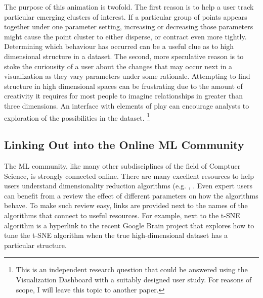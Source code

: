 \documentclass{sigchi}
\begin{document}
The purpose of this animation is twofold. %
%
The first reason is to help a user track particular emerging clusters of interest. %
%
If a particular group of points appears together under one parameter setting, increasing or decreasing those parameters might cause the point cluster to either disperse, or contract even more tightly. %
%
Determining which behaviour has occurred can be a useful clue as to high dimensional structure in a dataset. %
%
The second, more speculative reason is to stoke the curiousity of a user about the changes that may occur next in a visualization as they vary parameters under some rationale. %
%
Attempting to find structure in high dimensional spaces can be frustrating due to the amount of creativity it requires for most people to imagine relationships in greater than three dimensions.
%
An interface with elements of play can encourage analysts to exploration of the possibilities in the dataset.%
%
\footnote{This is an independent research question that could be answered using the Visualization Dashboard with a suitably designed user study. For reasons of scope, I will leave this topic to another paper.} %
%
%
\subsection{Linking Out into the Online ML Community}
%
%
The ML community, like many other subdisciplines of the field of Comptuer Science, is strongly connected online. %
%
There are many excellent resources to help users understand dimensionality reduction algorithms (e.g. \cite{wattenberg2016how}, \cite{setosaPCA}. %
%
Even expert users can benefit from a review the effect of different parameters on how the algorithms behave. %
%
To make such review easy, links are provided next to the names of the algorithms that connect to useful resources. %
%
For example, next to the t-SNE algorithm is a hyperlink to the recent Google Brain project \cite{wattenberg2016how} that explores how to tune the t-SNE algorithm when the true high-dimensional dataset has a particular structure. %
%
\end{document}

